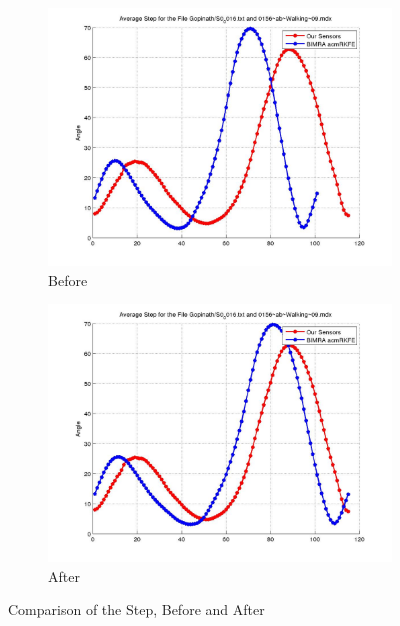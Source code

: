 \documentclass[12pt]{article}
\begin{document}
\begin{figure}[h]%

\begin{subfigure}[!htb]{2cm}
\hspace*{-2cm} \includegraphics[scale=.22]{S0_0016_before_acmrkfe.jpg}
\caption{Before}
\end{subfigure}
\hfill\hfill
\begin{subfigure}[h]{0.4\textwidth}
\hspace*{-2cm} \includegraphics[scale=.22]{S0_0016_after_acmrkfe.jpg}
\caption{After}
\end{subfigure}%

\caption[Hello]{Comparison of the Step, Before and After}
\end{figure}
\end{document}
